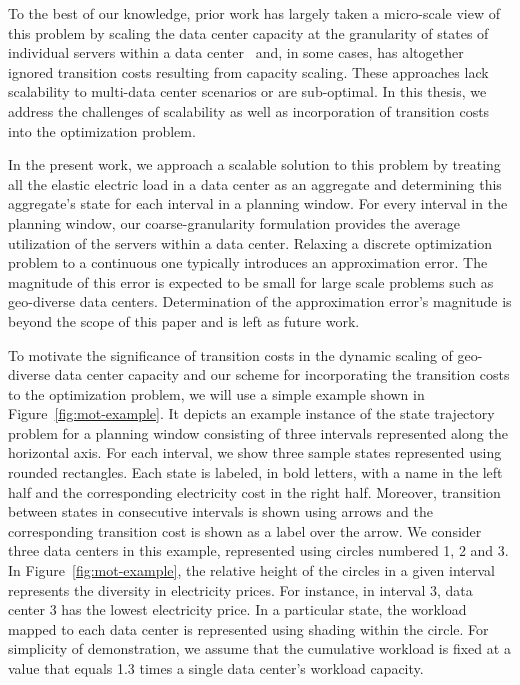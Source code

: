 To the best of our knowledge, prior work has largely taken a micro-scale view of this problem by scaling the data center capacity at the granularity of states of individual servers within a data center~\cite{Li:Optimal:TSG:2012,LinInfocom11,serverEnergy,Mazzucco2012415,rao2010,qureshi2009cutting} and, in some cases, has altogether ignored transition costs resulting from capacity scaling. These approaches lack scalability to multi-data center scenarios or are sub-optimal. In this thesis, we address the challenges of scalability as well as incorporation of transition costs into the optimization problem.

In the present work, we approach a scalable solution to this problem by treating all the elastic electric load in a data center as an aggregate and determining this aggregate's state for each interval in a planning window. For every interval in the planning window, our coarse-granularity formulation provides the average utilization of the servers within a data center. Relaxing a discrete optimization problem to a continuous one typically introduces an approximation error. The magnitude of this error is expected to be small for large scale problems such as geo-diverse data centers. Determination of the approximation error's magnitude is beyond the scope of this paper and is left as future work.

To motivate the significance of transition costs in the dynamic scaling of geo-diverse data center capacity and our scheme for incorporating the transition costs to the optimization problem, we will use a simple example shown in Figure~\ref{fig:mot-example}. It depicts an example instance of the
state trajectory problem for a planning window consisting of
three intervals represented along the horizontal axis. For each interval, we show three sample states represented using rounded rectangles. Each state is labeled, in bold letters, with a name in the left half and the corresponding electricity cost in the right half. Moreover, transition between states in consecutive intervals is shown using arrows and the corresponding transition cost is shown as a label over the arrow. We consider three data centers in this example, represented using circles
numbered 1, 2 and 3. In Figure~\ref{fig:mot-example}, the relative height of the circles in a given interval represents the diversity in electricity prices. For instance, in interval 3, data center 3 has the lowest electricity price. In a particular state, the workload mapped to each data center is represented using shading within the circle. For simplicity of demonstration, we assume that the cumulative
workload is fixed at a value that equals 1.3 times a single
data center's workload capacity. 


